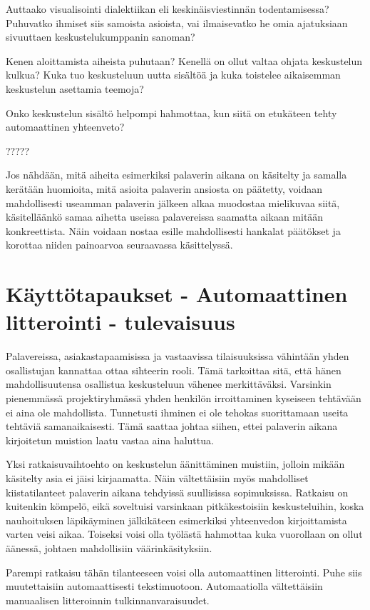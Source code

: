 \documentclass[11pt,a4paper,oneside]{memoir}
\begin{document}
Auttaako visualisointi dialektiikan eli keskinäisviestinnän todentamisessa? Puhuvatko ihmiset siis samoista asioista, vai ilmaisevatko he omia ajatuksiaan sivuuttaen keskustelukumppanin sanoman?

Kenen aloittamista aiheista puhutaan? Kenellä on ollut valtaa ohjata keskustelun kulkua? Kuka tuo keskusteluun uutta sisältöä ja kuka toistelee aikaisemman keskustelun asettamia teemoja?

Onko keskustelun sisältö helpompi hahmottaa, kun siitä on etukäteen tehty automaattinen yhteenveto?

?????

Jos nähdään, mitä aiheita esimerkiksi palaverin aikana on käsitelty ja samalla kerätään huomioita, mitä asioita palaverin ansiosta on päätetty, voidaan mahdollisesti useamman palaverin jälkeen alkaa muodostaa mielikuvaa siitä, käsitelläänkö samaa aihetta useissa palavereissa saamatta aikaan mitään konkreettista. Näin voidaan nostaa esille mahdollisesti hankalat päätökset ja korottaa niiden painoarvoa seuraavassa käsittelyssä.

\chapter{Käyttötapaukset - Automaattinen litterointi - tulevaisuus}
Palavereissa, asiakastapaamisissa ja vastaavissa tilaisuuksissa vähintään yhden osallistujan kannattaa ottaa sihteerin rooli. Tämä tarkoittaa sitä, että hänen mahdollisuutensa osallistua keskusteluun vähenee merkittäväksi. Varsinkin pienemmässä projektiryhmässä yhden henkilön irroittaminen kyseiseen tehtävään ei aina ole mahdollista. Tunnetusti ihminen ei ole tehokas suorittamaan useita tehtäviä samanaikaisesti. Tämä saattaa johtaa siihen, ettei palaverin aikana kirjoitetun muistion laatu vastaa aina haluttua.

Yksi ratkaisuvaihtoehto on keskustelun äänittäminen muistiin, jolloin mikään käsitelty asia ei jäisi kirjaamatta. Näin vältettäisiin myös mahdolliset kiistatilanteet palaverin aikana tehdyissä suullisissa sopimuksissa. Ratkaisu on kuitenkin kömpelö, eikä soveltuisi varsinkaan pitkäkestoisiin keskusteluihin, koska nauhoituksen läpikäyminen jälkikäteen esimerkiksi yhteenvedon kirjoittamista varten veisi aikaa. Toiseksi voisi olla työlästä hahmottaa kuka vuorollaan on ollut äänessä, johtaen mahdollisiin väärinkäsityksiin.

Parempi ratkaisu tähän tilanteeseen voisi olla automaattinen litterointi. Puhe siis muutettaisiin automaattisesti tekstimuotoon. Automaatiolla vältettäisiin manuaalisen litteroinnin tulkinnanvaraisuudet.
\end{document}
